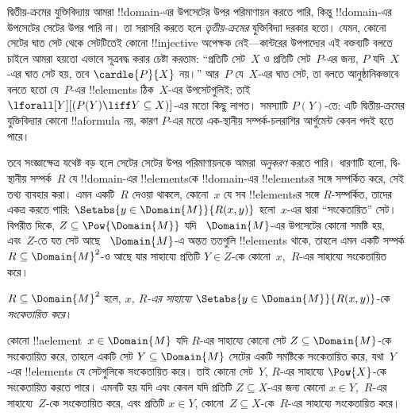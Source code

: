 \documentclass[../../../include/open-logic-section]{subfiles}
\begin{document}


\begin{explain}
দ্বিতীয়-ক্রমের যুক্তিবিদ্যায় আমরা !!{domain}-এর উপসেটের উপর পরিমাণায়ন
করতে পারি, কিন্তু !!{domain}-এর উপসেটের সেটের উপর পারি না। তা সরাসরি করতে
হলে \emph{তৃতীয়-ক্রমের} যুক্তিবিদ্যা দরকার হতো। যেমন, কোনো সেটের ঘাত সেট
থেকে সেটটিতেই কোনো !!{injective} অপেক্ষক নেই---কান্টরের উপপাদ্যের এই
বক্তব্যটি বলতে চাইলে আমরা হয়তো এভাবে সূত্রবদ্ধ করার চেষ্টা করতাম: ``প্রতিটি
সেট~$X$ ও প্রতিটি সেট~$P$-এর জন্য, $P$ যদি~$X$-এর ঘাত সেট হয়, তবে
$\cardle{P}{X}$ নয়।'' আর~$P$ যে~$X$-এর ঘাত সেট, তা বলতে আনুষ্ঠানিকভাবে
বলতে হতো যে~$P$-এর !!{element}s ঠিক~$X$-এর উপসেটগুলিই; তাই
$\lforall[Y][(P(Y) \liff Y \subseteq X)]$-এর মতো কিছু লাগত। সমস্যাটি
$P(Y)$-তে: এটি দ্বিতীয়-ক্রমের যুক্তিবিদ্যার কোনো !!a{formula} নয়, কারণ
$P$-এর মতো এক-স্থানীয় সম্পর্ক-চলরাশির আর্গুমেন্ট কেবল পদই হতে পারে।

তবে সংজ্ঞাক্ষেত্র যথেষ্ট বড় হলে সেটের সেটের উপর পরিমাণায়নকে আমরা
\emph{অনুকরণ} করতে পারি। ধারণাটি হলো, দ্বি-স্থানীয় সম্পর্ক~$R$ যে
!!{domain}-এর !!{element}sকে !!{domain}-এর !!{element}sর সঙ্গে
সম্পর্কিত করে, সেই তথ্য ব্যবহার করা। এমন একটি~$R$ দেওয়া থাকলে, কোনো~$x$
যে সব !!{element}sর সঙ্গে $R$-সম্পর্কিত, তাদের একত্র করতে পারি:
$\Setabs{y \in \Domain{M}}{R(x,y)}$ হলো~$x$-এর দ্বারা ``সংকেতায়িত''
সেট। বিপরীত দিকে, $Z \subseteq \Pow{\Domain{M}}$ যদি
~$\Domain{M}$-এর উপসেটের কোনো সমষ্টি হয়, এবং~$Z$-তে যত সেট আছে
~$\Domain{M}$-এ অন্তত ততগুলি !!{element}s থাকে, তাহলে এমন একটি সম্পর্ক
$R \subseteq \Domain{M}^2$-ও আছে যার সাহায্যে প্রতিটি $Y \in Z$-কে
কোনো~$x$,~$R$-এর সাহায্যে সংকেতায়িত করে।
\end{explain}

\begin{defn}
$R \subseteq \Domain{M}^2$ হলে, \emph{$x$, $R$-এর সাহায্যে}
$\Setabs{y \in \Domain{M}}{R(x, y)}$-কে \emph{সংকেতায়িত করে}।
\end{defn}

কোনো !!a{element}~$x \in \Domain{M}$ যদি $R$-এর সাহায্যে কোনো সেট $Z
\subseteq \Domain{M}$-কে সংকেতায়িত করে, তাহলে একটি সেট $Y \subseteq
\Domain{M}$ সেটের একটি সমষ্টিকে সংকেতায়িত করে, যথা~$Y$-এর !!{element}s
যে সেটগুলিকে সংকেতায়িত করে। তাই কোনো সেট~$Y$, $R$-এর সাহায্যে
$\Pow{X}$-কে সংকেতায়িত করতে পারে। এমনটি হয় যদি এবং কেবল যদি প্রতিটি $Z
\subseteq X$-এর জন্য কোনো $x \in Y$,~$R$-এর সাহায্যে~$Z$-কে সংকেতায়িত
করে, এবং প্রতিটি $x \in Y$, কোনো~$Z \subseteq X$-কে~$R$-এর সাহায্যে
সংকেতায়িত করে।
\end{document}
